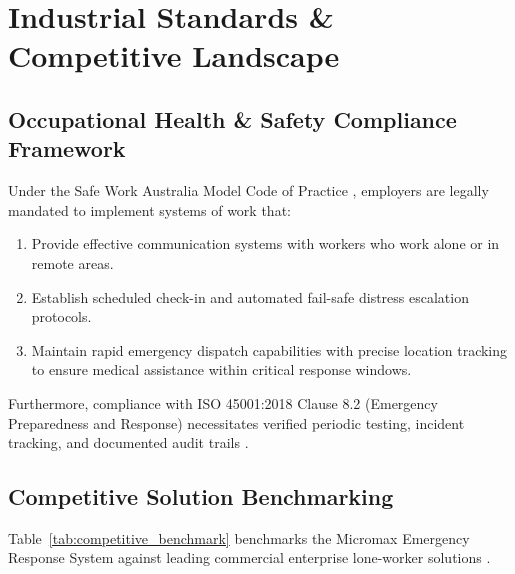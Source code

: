 \section{Industrial Standards \& Competitive Landscape}

\subsection{Occupational Health \& Safety Compliance Framework}
Under the Safe Work Australia Model Code of Practice \cite{safework2020}, employers are legally mandated to implement systems of work that:
\begin{enumerate}
    \item Provide effective communication systems with workers who work alone or in remote areas.
    \item Establish scheduled check-in and automated fail-safe distress escalation protocols.
    \item Maintain rapid emergency dispatch capabilities with precise location tracking to ensure medical assistance within critical response windows.
\end{enumerate}

Furthermore, compliance with ISO 45001:2018 Clause 8.2 (Emergency Preparedness and Response) necessitates verified periodic testing, incident tracking, and documented audit trails \cite{iso45001}.

\subsection{Competitive Solution Benchmarking}
Table~\ref{tab:competitive_benchmark} benchmarks the Micromax Emergency Response System against leading commercial enterprise lone-worker solutions \cite{lone_worker_safety_review}.

